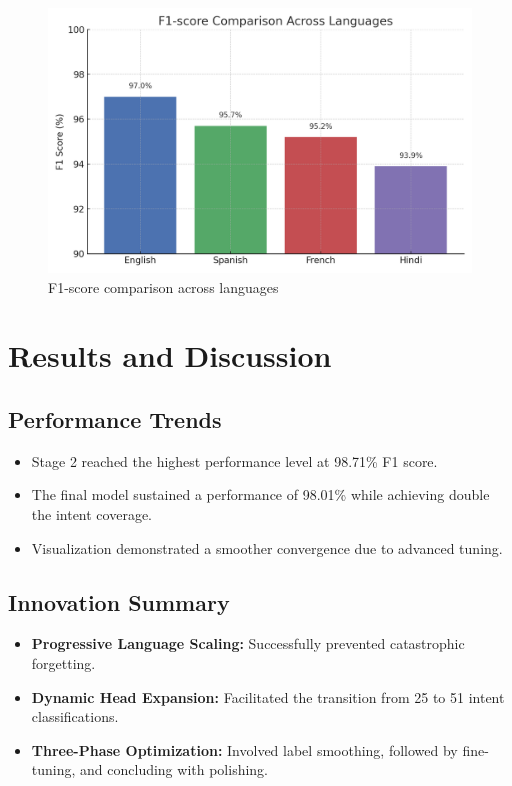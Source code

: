 \documentclass{ecai}
\begin{document}
\begin{figure}[h]
\centering
\includegraphics[width=0.8\linewidth]{f1_chart.png}
\caption{F1-score comparison across languages}
\end{figure}

\section{Results and Discussion}

\subsection{Performance Trends}
\begin{itemize}
    \item Stage 2 reached the highest performance level at 98.71\% F1 score.
    \item The final model sustained a performance of 98.01\% while achieving double the intent coverage.
    \item Visualization demonstrated a smoother convergence due to advanced tuning.
\end{itemize}

\subsection{Innovation Summary}
\begin{itemize}
    \item \textbf{Progressive Language Scaling:} Successfully prevented catastrophic forgetting.
    \item \textbf{Dynamic Head Expansion:} Facilitated the transition from 25 to 51 intent classifications.
    \item \textbf{Three-Phase Optimization:} Involved label smoothing, followed by fine-tuning, and concluding with polishing.
\end{itemize}
\end{document}
